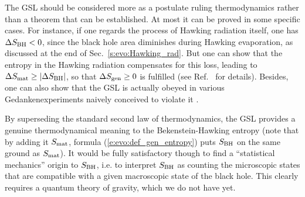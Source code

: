 The GSL should be considered more as a postulate ruling
thermodynamics rather than a theorem that can be established. At most it
can be proved in some specific cases.
For instance, if one regards the process of Hawking radiation itself, one
has $\Delta S_{\rm BH} < 0$, since the black hole area diminishes
during Hawking evaporation, as discussed at the end of
Sec.~\ref{s:evo:Hawking_rad}. But one can show that the entropy in the Hawking radiation
compensates for this loss, leading to $\Delta S_{\rm mat} \geq |\Delta S_{\rm BH}|$,
so that $ \Delta S_{\rm gen} \geq 0$ is fulfilled (see Ref.~\cite{Wald01} for details).
Besides, one can also show that the GSL is actually  obeyed in various Gedankenexperiments
naively conceived to violate it \cite{Wald01}.

By superseding the standard second law of thermodynamics, the GSL provides a
genuine thermodynamical meaning to the Bekenstein-Hawking entropy
(note that by adding it $S_{\rm mat}$, formula (\ref{e:evo:def_gen_entropy})
puts $S_{\rm BH}$ on the same ground as $S_{\rm mat}$). It would be fully satisfactory though to
find a ``statistical mechanics'' origin to $S_{\rm BH}$, i.e. to interpret $S_{\rm BH}$
as counting the microscopic states that are compatible with a given macroscopic
state of the black hole. This clearly requires a quantum theory of gravity,
which we do not have yet.



